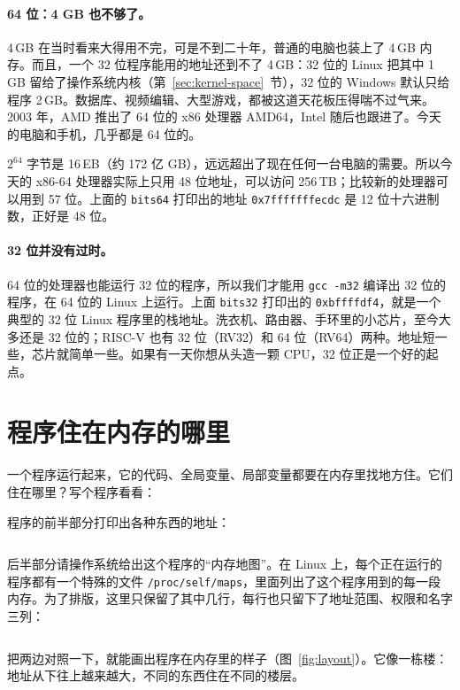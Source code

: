 \paragraph{64 位：4 GB 也不够了。}
4\,GB 在当时看来大得用不完，可是不到二十年，普通的电脑也装上了 4\,GB 内存。而且，一个 32 位程序能用的地址还到不了 4\,GB：32 位的 Linux 把其中 1\,GB 留给了操作系统内核（第~\ref{sec:kernel-space}~节），32 位的 Windows 默认只给程序 2\,GB。数据库、视频编辑、大型游戏，都被这道天花板压得喘不过气来。2003 年，AMD 推出了 64 位的 x86 处理器 AMD64，Intel 随后也跟进了。今天的电脑和手机，几乎都是 64 位的。

$2^{64}$ 字节是 16\,EB（约 172 亿 GB），远远超出了现在任何一台电脑的需要。所以今天的 x86-64 处理器实际上只用 48 位地址，可以访问 256\,TB；比较新的处理器可以用到 57 位。上面的 \texttt{bits64} 打印出的地址 \texttt{0x7fffffffecdc} 是 12 位十六进制数，正好是 48 位。

\paragraph{32 位并没有过时。}
64 位的处理器也能运行 32 位的程序，所以我们才能用 \texttt{gcc -m32} 编译出 32 位的程序，在 64 位的 Linux 上运行。上面 \texttt{bits32} 打印出的 \texttt{0xbffffdf4}，就是一个典型的 32 位 Linux 程序里的栈地址。洗衣机、路由器、手环里的小芯片，至今大多还是 32 位的；RISC-V 也有 32 位（RV32）和 64 位（RV64）两种。地址短一些，芯片就简单一些。如果有一天你想从头造一颗 CPU，32 位正是一个好的起点。

\section{程序住在内存的哪里}
\label{sec:layout}

一个程序运行起来，它的代码、全局变量、局部变量都要在内存里找地方住。它们住在哪里？写个程序看看：


程序的前半部分打印出各种东西的地址：
\inputminted[linenos=false]{text}{code/ch04/out/layout.txt}

后半部分请操作系统给出这个程序的“内存地图”。在 Linux 上，每个正在运行的程序都有一个特殊的文件 \texttt{/proc/self/maps}，里面列出了这个程序用到的每一段内存。为了排版，这里只保留了其中几行，每行也只留下了地址范围、权限和名字三列：
\inputminted[linenos=false]{text}{code/ch04/out/layout_maps.txt}

把两边对照一下，就能画出程序在内存里的样子（图~\ref{fig:layout}）。它像一栋楼：地址从下往上越来越大，不同的东西住在不同的楼层。

